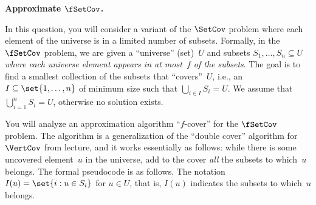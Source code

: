 \documentclass[11pt,addpoints]{exam}
\begin{document}
\begin{questions}

  \question \textbf{Approximate $\fSetCov$.}

  In this question, you will consider a variant of the $\SetCov$ problem where each element of the universe is in a limited number of subsets.
  Formally, in the $\fSetCov$ problem, we are given a ``universe'' (set)~$U$ and subsets $S_1, \ldots, S_n \subseteq U$ \emph{where each universe element appears in at most~$f$ of the subsets}.
  The goal is to find a smallest collection of the subsets that ``covers''~$U$, i.e., an $I \subseteq \set{1,\ldots,n}$ of minimum size such that $\bigcup_{i \in I} S_{i} = U$.
  We assume that $\bigcup_{i=1}^{n} S_{i} = U$, otherwise no solution exists.

  You will analyze an approximation algorithm ``$f$-cover'' for the $\fSetCov$ problem.
  The algorithm is a generalization of the ``double cover'' algorithm for $\VertCov$ from lecture, and it works essentially as follows: while there is some uncovered element~$u$ in the universe, add to the cover \emph{all} the subsets to which~$u$ belongs.
  The formal pseudocode is as follows.
  The notation $I(u) = \set{i : u \in S_i}$ for $u \in U$, that is, $I(u)$ indicates the subsets to which~$u$ belongs.


\end{questions}
\end{document}
